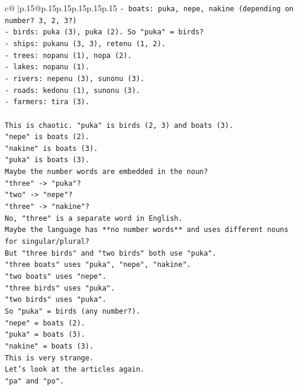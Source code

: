 \documentclass{article}
\begin{document}
{\begin{supertabular}{c@{$\;$}|p{.15\linewidth}@{}p{.15\linewidth}p{.15\linewidth}p{.15\linewidth}p{.15\linewidth}p{.15\linewidth}}
{{{\texttt{{-} boats: puka, nepe, nakine (depending on number? 3, 2, 3?)} \\
\texttt{{-} birds: puka (3), puka (2). So "puka" = birds?} \\
\texttt{{-} ships: pukanu (3, 3), retenu (1, 2).} \\
\texttt{{-} trees: nopanu (1), nopa (2).} \\
\texttt{{-} lakes: nopanu (1).} \\
\texttt{{-} rivers: nepenu (3), sunonu (3).} \\
\texttt{{-} roads: kedonu (1), sunonu (3).} \\
\texttt{{-} farmers: tira (3).} \\
\\ 
\texttt{This is chaotic. "puka" is birds (2, 3) and boats (3).} \\
\texttt{"nepe" is boats (2).} \\
\texttt{"nakine" is boats (3).} \\
\texttt{"puka" is boats (3).} \\
\texttt{Maybe the number words are embedded in the noun?} \\
\texttt{"three" {-}> "puka"?} \\
\texttt{"two" {-}> "nepe"?} \\
\texttt{"three" {-}> "nakine"?} \\
\texttt{No, "three" is a separate word in English.} \\
\texttt{Maybe the language has **no number words** and uses different nouns for singular/plural?} \\
\texttt{But "three birds" and "two birds" both use "puka".} \\
\texttt{"three boats" uses "puka", "nepe", "nakine".} \\
\texttt{"two boats" uses "nepe".} \\
\texttt{"three birds" uses "puka".} \\
\texttt{"two birds" uses "puka".} \\
\texttt{So "puka" = birds (any number?).} \\
\texttt{"nepe" = boats (2).} \\
\texttt{"puka" = boats (3).} \\
\texttt{"nakine" = boats (3).} \\
\texttt{This is very strange.} \\
\texttt{Let's look at the articles again.} \\
\texttt{"pa" and "po".} \\
}}}
\end{supertabular}}
\end{document}
